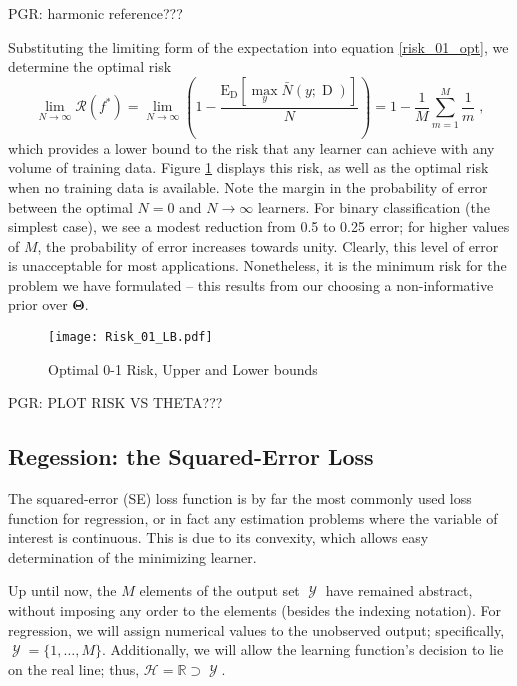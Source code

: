\documentclass[12pt]{report}
\DeclareMathOperator{\Drm}{\mathrm{D}}
\DeclareMathOperator{\Ycal}{\mathcal{Y}}
\begin{document}
PGR: harmonic reference???

Substituting the limiting form of the expectation into equation \eqref{risk_01_opt}, we determine the optimal risk
\begin{equation}
\lim_{N \to \infty} \mathcal{R}(f^*)  = \lim_{N \to \infty} \left( 1 - \frac{\text{E}_{\Drm} \left[ \max_y \bar{N}(y;\Drm) \right]}{N} \right) = 1 - \frac{1}{M} \sum_{m=1}^M \frac{1}{m} \;,
\end{equation}
which provides a lower bound to the risk that any learner can achieve with any volume of training data. Figure \ref{fig:Risk_01_LB} displays this risk, as well as the optimal risk when no training data is available. Note the margin in the probability of error between the optimal $N=0$ and $N \to \infty$ learners. For binary classification (the simplest case), we see a modest reduction from 0.5 to 0.25 error; for higher values of $M$, the probability of error increases towards unity. Clearly, this level of error is unacceptable for most applications. Nonetheless, it is the minimum risk for the problem we have formulated -- this results from our choosing a non-informative prior over $\bm{\Theta}$.

\begin{figure}
\centering
\texttt{[image: Risk\_01\_LB.pdf]}
\caption{Optimal 0-1 Risk, Upper and Lower bounds}
\label{fig:Risk_01_LB}
\end{figure}

PGR: PLOT RISK VS THETA???



\subsection{Regession: the Squared-Error Loss}

The squared-error (SE) loss function is by far the most commonly used loss function for regression, or in fact any estimation problems where the variable of interest is continuous. This is due to its convexity, which allows easy determination of the minimizing learner. 

Up until now, the $M$ elements of the output set $\Ycal$ have remained abstract, without imposing any order to the elements (besides the indexing notation). For regression, we will assign numerical values to the unobserved output; specifically, $\Ycal = \{1,\ldots,M\}$. Additionally, we will allow the learning function's decision to lie on the real line; thus, $\mathcal{H} = \mathbb{R} \supset \Ycal$.
\end{document}
